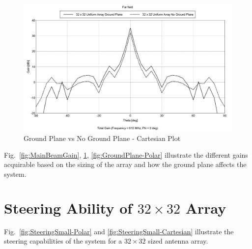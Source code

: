 \documentclass[11pt]{witseiepaper}
\begin{document}
\begin{bibunit}[witseie]
\begin{figure}[htb]
    \centering
    \includegraphics[width=\linewidth]{GroundPlane-Cartesian.pdf}
    \caption{Ground Plane vs No Ground Plane - Cartesian Plot}
    \label{fig:GroundPlane-Cartesian}
\end{figure}




Fig.~\ref{fig:MainBeamGain}, \ref{fig:GroundPlane-Cartesian}, \ref{fig:GroundPlane-Polar}  illustrate the different gains acquirable based on the sizing of the array and how the ground plane affects the system.

\section{Steering Ability of $32 \times 32$ Array} \label{sec:SteeringAbility}
Fig.~\ref{fig:SteeringSmall-Polar} and \ref{fig:SteeringSmall-Cartesian} illustrate the steering capabilities of the system for a $32 \times 32$ sized antenna array.


\end{bibunit}
\end{document}
